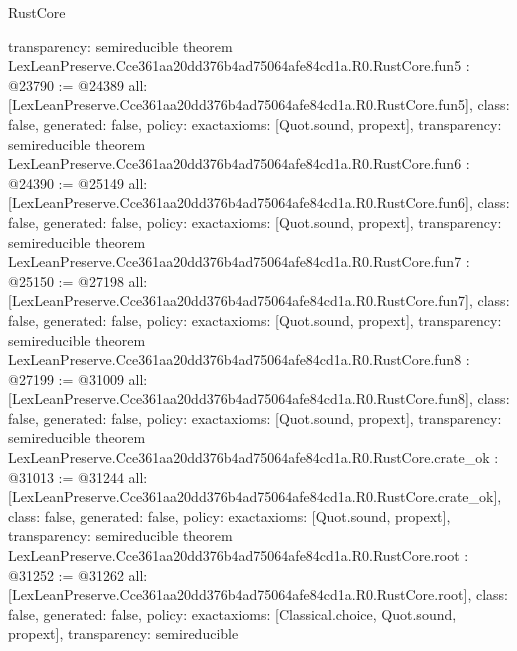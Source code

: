 \begin{lexlean}{RustCore}
\begin{coremodule}
{  transparency: semireducible
}
theorem LexLeanPreserve.Cce361aa20dd376b4ad75064afe84cd1a.R0.RustCore.fun5 : @23790 := @24389 {
  all: [LexLeanPreserve.Cce361aa20dd376b4ad75064afe84cd1a.R0.RustCore.fun5],
  class: false,
  generated: false,
  policy: exact{axioms: [Quot.sound, propext]},
  transparency: semireducible
}
theorem LexLeanPreserve.Cce361aa20dd376b4ad75064afe84cd1a.R0.RustCore.fun6 : @24390 := @25149 {
  all: [LexLeanPreserve.Cce361aa20dd376b4ad75064afe84cd1a.R0.RustCore.fun6],
  class: false,
  generated: false,
  policy: exact{axioms: [Quot.sound, propext]},
  transparency: semireducible
}
theorem LexLeanPreserve.Cce361aa20dd376b4ad75064afe84cd1a.R0.RustCore.fun7 : @25150 := @27198 {
  all: [LexLeanPreserve.Cce361aa20dd376b4ad75064afe84cd1a.R0.RustCore.fun7],
  class: false,
  generated: false,
  policy: exact{axioms: [Quot.sound, propext]},
  transparency: semireducible
}
theorem LexLeanPreserve.Cce361aa20dd376b4ad75064afe84cd1a.R0.RustCore.fun8 : @27199 := @31009 {
  all: [LexLeanPreserve.Cce361aa20dd376b4ad75064afe84cd1a.R0.RustCore.fun8],
  class: false,
  generated: false,
  policy: exact{axioms: [Quot.sound, propext]},
  transparency: semireducible
}
theorem LexLeanPreserve.Cce361aa20dd376b4ad75064afe84cd1a.R0.RustCore.crate_ok : @31013 := @31244 {
  all: [LexLeanPreserve.Cce361aa20dd376b4ad75064afe84cd1a.R0.RustCore.crate_ok],
  class: false,
  generated: false,
  policy: exact{axioms: [Quot.sound, propext]},
  transparency: semireducible
}
theorem LexLeanPreserve.Cce361aa20dd376b4ad75064afe84cd1a.R0.RustCore.root : @31252 := @31262 {
  all: [LexLeanPreserve.Cce361aa20dd376b4ad75064afe84cd1a.R0.RustCore.root],
  class: false,
  generated: false,
  policy: exact{axioms: [Classical.choice, Quot.sound, propext]},
  transparency: semireducible
}


\end{coremodule}
\end{lexlean}
